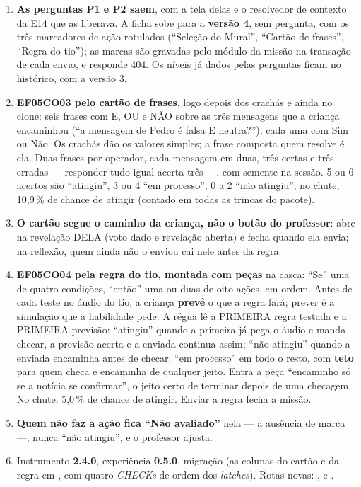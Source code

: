 \begin{enumerate}
  \item \textbf{As perguntas P1 e P2 saem}, com a tela delas e o resolvedor de
    contexto da E14 que as liberava. A ficha sobe para a \textbf{versão 4}, sem
    pergunta, com os três marcadores de ação rotulados (\enquote{Seleção do
    Mural}, \enquote{Cartão de frases}, \enquote{Regra do tio}); as marcas são
    gravadas pelo módulo da missão na transação de cada envio, e
     responde 404. Os níveis já dados
    pelas perguntas ficam no histórico, com a versão 3.
  \item \textbf{EF05CO03 pelo cartão de frases}, logo depois dos crachás e
    ainda no clone: seis frases com E, OU e NÃO sobre as três mensagens que a
    criança encaminhou (\enquote{a mensagem de Pedro é falsa E neutra?}), cada
    uma com Sim ou Não. Os crachás dão os valores simples; a frase composta
    quem resolve é ela. Duas frases por operador, cada mensagem em duas, três
    certas e três erradas --- responder tudo igual acerta três ---, com
    semente na sessão. 5 ou 6 acertos são \enquote{atingiu}, 3 ou 4 \enquote{em
    processo}, 0 a 2 \enquote{não atingiu}; no chute, 10,9\,\% de chance de
    atingir (contado em todas as trincas do pacote).
  \item \textbf{O cartão segue o caminho da criança, não o botão do
    professor}: abre na revelação DELA (voto dado e revelação aberta) e fecha
    quando ela envia; na reflexão, quem ainda não o enviou cai nele antes da
    regra.
  \item \textbf{EF05CO04 pela regra do tio, montada com peças} na casca:
    \enquote{Se} uma de quatro condições, \enquote{então} uma ou duas de oito
    ações, em ordem. Antes de cada teste no áudio do tio, a criança
    \textbf{prevê} o que a regra fará; prever é a simulação que a habilidade
    pede. A régua lê a PRIMEIRA regra testada e a PRIMEIRA previsão:
    \enquote{atingiu} quando a primeira já pega o áudio e manda checar, a
    previsão acerta e a enviada continua assim; \enquote{não atingiu} quando a
    enviada encaminha antes de checar; \enquote{em processo} em todo o resto,
    com \textbf{teto} para quem checa e encaminha de qualquer jeito. Entra a
    peça \enquote{encaminho só se a notícia se confirmar}, o jeito certo de
    terminar depois de uma checagem. No chute, 5,0\,\% de chance de atingir.
    Enviar a regra fecha a missão.
  \item \textbf{Quem não faz a ação fica \enquote{Não avaliado}} nela --- a
    ausência de marca ---, nunca \enquote{não atingiu}, e o professor ajusta.
  \item Instrumento \textbf{2.4.0}, experiência \textbf{0.5.0}, migração
     (as colunas do cartão e
    da regra em , com quatro \emph{CHECKs} de ordem dos
    \emph{latches}). Rotas novas: ,
     e
    .
\end{enumerate}

